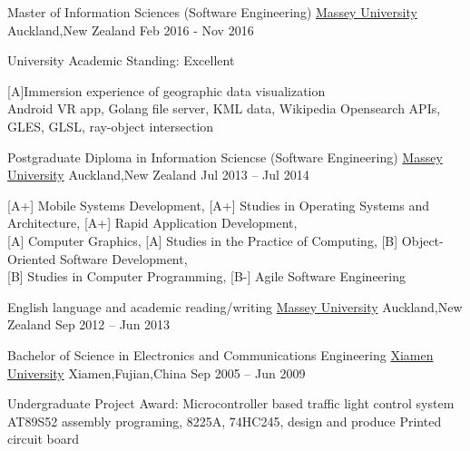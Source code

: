 
\begin{cventries}
\cventry
{Master of Information Sciences (Software Engineering)}
{\href{http://www.massey.ac.nz/}{Massey University}}
{Auckland,\enskip New Zealand}
{Feb 2016 - Nov 2016}
{
	\begin{cvitems}
		\item{University Academic Standing: Excellent}
		\item {[A]Immersion experience of geographic data visualization\\
			Android VR app, Golang file server, KML data, Wikipedia Opensearch APIs, GLES, GLSL, ray-object intersection}
	\end{cvitems}
}
\end{cventries}

\begin{cventries}
	\cventry
	{Postgraduate Diploma in Information Sciencse (Software Engineering)}
	{\href{http://www.massey.ac.nz/}{Massey University}}
	{Auckland,\enskip New Zealand}
	{Jul 2013 – Jul 2014}
	{
		\begin{cvitems}
			\item{[A+] Mobile Systems Development},\enskip
			{[A+] Studies in Operating Systems and Architecture},\enskip
			{[A+] Rapid Application Development},\enskip\\
			{[A] Computer Graphics},\enskip
			{[A] Studies in the Practice of Computing},\enskip
			{[B] Object-Oriented Software Development},\enskip\\
			{[B] Studies in Computer Programming},\enskip
			{[B-] Agile Software Engineering}\enskip
		\end{cvitems}
	}
\end{cventries}

\begin{cventries}
	\cventry
	{English language and academic reading/writing}
	{\href{http://www.massey.ac.nz/}{Massey University}}
	{Auckland,\enskip New Zealand}
	{Sep 2012 – Jun 2013}
	{
		\begin{cvitems}
		\end{cvitems}
	}
\end{cventries}

\begin{cventries}
	\cventry
	{Bachelor of Science in Electronics and Communications Engineering}
	{\href{http://www.xmu.edu.cn/en/}{Xiamen University}}
	{Xiamen,\enskip Fujian,\enskip China}
	{Sep 2005 – Jun 2009}
	{
		\begin{cvitems}
			\item {Undergraduate Project Award: Microcontroller based traffic light control system\\
			AT89S52 assembly programing, 8225A, 74HC245, design and produce Printed circuit board}
		\end{cvitems}
	}
\end{cventries}

